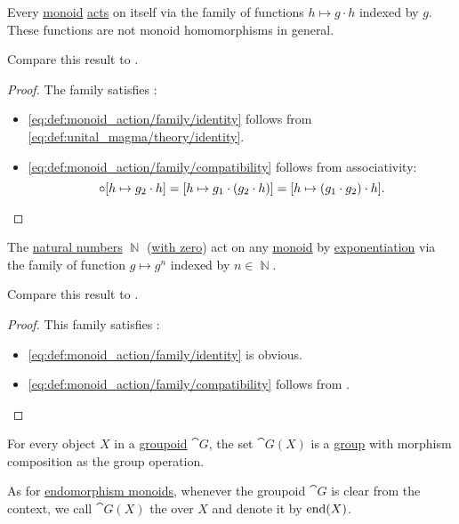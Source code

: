 \begin{proposition}\label{thm:monoid_is_action}
  Every \hyperref[def:unital_magma/monoid]{monoid} \hyperref[def:monoid_action]{acts} on itself via the family of functions \( h \mapsto g \cdot h \) indexed by \( g \). These functions are not monoid homomorphisms in general.

  Compare this result to .
\end{proposition}
\begin{proof}
  The family satisfies :
  \begin{itemize}
    \item \ref{eq:def:monoid_action/family/identity} follows from \eqref{eq:def:unital_magma/theory/identity}.

    \item \ref{eq:def:monoid_action/family/compatibility} follows from associativity:
    \begin{equation*}
      [h \mapsto g_1 \cdot h] \bincirc [h \mapsto g_2 \cdot h] = [h \mapsto g_1 \cdot (g_2 \cdot h)] = [h \mapsto (g_1 \cdot g_2) \cdot h].
    \end{equation*}
  \end{itemize}
\end{proof}

\begin{proposition}\label{thm:exponentiation_monoid_action}
  The \hyperref[def:set_of_natural_numbers]{natural numbers} \( \BbbN \) (\hyperref[rem:peano_arithmetic_zero]{with zero}) act on any \hyperref[def:unital_magma/monoid]{monoid} by \hyperref[def:unital_magma/exponentiation]{exponentiation} via the family of function \( g \mapsto g^n \) indexed by \( n \in \BbbN \).

  Compare this result to .
\end{proposition}
\begin{proof}
  This family satisfies :
  \begin{itemize}
    \item \ref{eq:def:monoid_action/family/identity} is obvious.
    \item \ref{eq:def:monoid_action/family/compatibility} follows from .
  \end{itemize}
\end{proof}

\begin{definition}\label{def:automorphism_group}
  For every object \( X \) in a \hyperref[def:groupoid]{groupoid} \( \cat{G} \), the set \( \cat{G}(X) \) is a \hyperref[def:group]{group} with morphism composition as the group operation.

  As for \hyperref[def:endomorphism_monoid]{endomorphism monoids}, whenever the groupoid \( \cat{G} \) is clear from the context, we call \( \cat{G}(X) \) the  over \( X \) and denote it by \( \operatorname{end}(X) \).
\end{definition}

